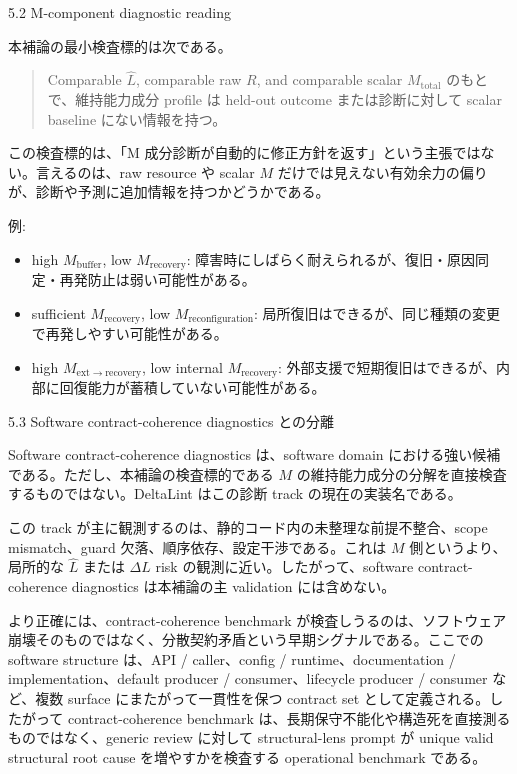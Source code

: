 \documentclass[12pt,a4paper]{article}
\begin{document}
5.2 M-component diagnostic reading

本補論の最小検査標的は次である。

\begin{quote}
Comparable $\hat L$, comparable raw $R$, and comparable scalar $M_{\mathrm{total}}$ のもとで、維持能力成分 profile は held-out outcome または診断に対して scalar baseline にない情報を持つ。
\end{quote}

この検査標的は、「M 成分診断が自動的に修正方針を返す」という主張ではない。言えるのは、raw resource や scalar \(M\) だけでは見えない有効余力の偏りが、診断や予測に追加情報を持つかどうかである。

例:

\begin{itemize}
\tightlist
\item
  high \(M_{\mathrm{buffer}}\), low \(M_{\mathrm{recovery}}\): 障害時にしばらく耐えられるが、復旧・原因同定・再発防止は弱い可能性がある。
\item
  sufficient \(M_{\mathrm{recovery}}\), low \(M_{\mathrm{reconfiguration}}\): 局所復旧はできるが、同じ種類の変更で再発しやすい可能性がある。
\item
  high \(M_{\mathrm{ext}\to\mathrm{recovery}}\), low internal \(M_{\mathrm{recovery}}\): 外部支援で短期復旧はできるが、内部に回復能力が蓄積していない可能性がある。
\end{itemize}

5.3 Software contract-coherence diagnostics との分離

Software contract-coherence diagnostics は、software domain における強い候補である。ただし、本補論の検査標的である \(M\) の維持能力成分の分解を直接検査するものではない。DeltaLint はこの診断 track の現在の実装名である。

この track が主に観測するのは、静的コード内の未整理な前提不整合、scope mismatch、guard 欠落、順序依存、設定干渉である。これは \(M\) 側というより、局所的な \(\hat L\) または \(\Delta L\) risk の観測に近い。したがって、software contract-coherence diagnostics は本補論の主 validation には含めない。

より正確には、contract-coherence benchmark が検査しうるのは、ソフトウェア崩壊そのものではなく、分散契約矛盾という早期シグナルである。ここでの software structure は、API / caller、config / runtime、documentation / implementation、default producer / consumer、lifecycle producer / consumer など、複数 surface にまたがって一貫性を保つ contract set として定義される。したがって contract-coherence benchmark は、長期保守不能化や構造死を直接測るものではなく、generic review に対して structural-lens prompt が unique valid structural root cause を増やすかを検査する operational benchmark である。
\end{document}
